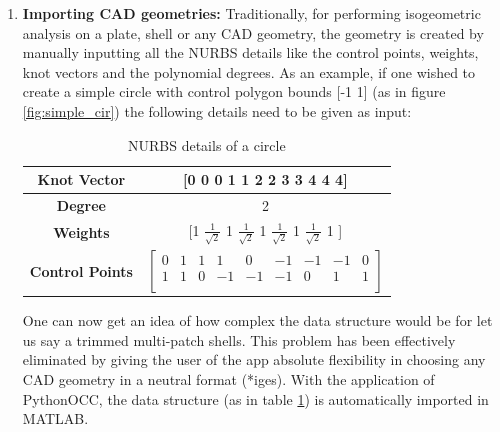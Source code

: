 \documentclass[12pt, a4paper]{report}
\begin{document}
\begin{enumerate}
    \item \textbf{Importing CAD geometries:}\newline
    Traditionally, for performing isogeometric analysis on a plate, shell or any CAD geometry, the geometry is created by manually inputting all the NURBS details like the control points, weights, knot vectors and the polynomial degrees. As an example, if one wished to create a simple circle with control polygon bounds [-1 1] (as in figure \ref{fig:simple_cir}) the following details need to be given as input:
        \begin{table}[htbp]
        \centering
            \begin{tabular}{|c|c|}
                \hline
                \textbf{Knot Vector} & [0 0 0 1 1 2 2 3 3 4 4 4] \\
                \hline
                \textbf{Degree} & 2 \\
                \hline
                \textbf{Weights} & [1 $\frac{1}{\sqrt{2}}$ 1 $\frac{1}{\sqrt{2}}$ 1 $\frac{1}{\sqrt{2}}$ 1 $\frac{1}{\sqrt{2}}$ 1 ] \\
                \hline
                \textbf{Control Points} & $
                                            \begin{bmatrix}
                                                0 & 1 & 1 & 1 & 0 & -1 & -1 & -1 & 0 \\
                                                1 & 1 & 0 & -1 & -1 & -1 & 0 & 1 & 1 \\
                                            \end{bmatrix}
                                        $ \\
                \hline
            \end{tabular}
        \caption{NURBS details of a circle}
        \label{tab:NURBS_DATA}
        \end{table}
    One can now get an idea of how complex the data structure would be for let us say a trimmed multi-patch shells. This problem has been effectively eliminated by giving the user of the app absolute flexibility in choosing any CAD geometry in a neutral format (*iges). With the application of PythonOCC, the data structure (as in table \ref{tab:NURBS_DATA}) is automatically imported in MATLAB.


\end{enumerate}
\end{document}
